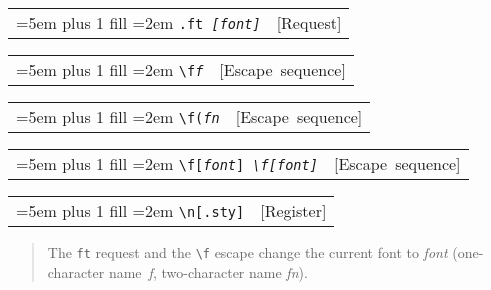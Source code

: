 \documentclass{book}
\newcommand\GNUTexinfocommandstyletextvar[1]{{\normalfont{}\textsl{#1}}}%
\begin{document}
\noindent\begin{tabularx}{\linewidth}{@{}Xr}
\rightskip=5em plus 1 fill
\hangindent=2em
\texttt{\texttt{.ft} \EmbracOn{}\textnormal{\textsl{[\EmbracOff{}\textnormal{\textsl{font}}\EmbracOn{}]}}\EmbracOff{}}& [Request]
\end{tabularx}

%

\noindent\begin{tabularx}{\linewidth}{@{}Xr}
\rightskip=5em plus 1 fill
\hangindent=2em
\texttt{\texttt{\textbackslash{}f}\textnormal{\textsl{f}}\texttt{}}& [Escape~sequence]
\end{tabularx}

%

\noindent\begin{tabularx}{\linewidth}{@{}Xr}
\rightskip=5em plus 1 fill
\hangindent=2em
\texttt{\texttt{\textbackslash{}f(}\textnormal{\textsl{fn}}\texttt{}}& [Escape~sequence]
\end{tabularx}

%

\noindent\begin{tabularx}{\linewidth}{@{}Xr}
\rightskip=5em plus 1 fill
\hangindent=2em
\texttt{\texttt{\textbackslash{}f[}\textnormal{\textsl{font}}\texttt{]} \EmbracOn{}\textnormal{\textsl{\texttt{\textbackslash{}f[}\EmbracOff{}\textnormal{\textsl{font}}\EmbracOn{}\texttt{]}}}\EmbracOff{}}& [Escape~sequence]
\end{tabularx}

%

\noindent\begin{tabularx}{\linewidth}{@{}Xr}
\rightskip=5em plus 1 fill
\hangindent=2em
\texttt{\texttt{\textbackslash{}n[.sty]}}& [Register]
\end{tabularx}

%
\begin{quote}
\unskip{\parskip=0pt\noindent}%
The \texttt{ft} request and the \texttt{\textbackslash{}f} escape change the current font
to \GNUTexinfocommandstyletextvar{font} (one-character name~\GNUTexinfocommandstyletextvar{f}, two-character name
\GNUTexinfocommandstyletextvar{fn}).
\end{quote}
\end{document}

